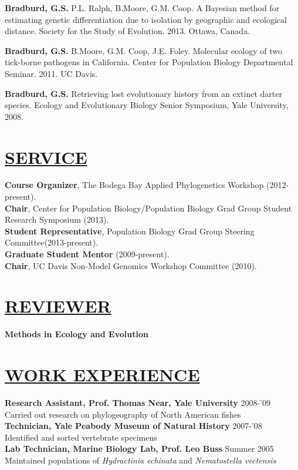 \documentclass{res}
\begin{document}
\begin{resume}
\textbf{Bradburd, G.S.}  P.L. Ralph, B.Moore, G.M. Coop. A Bayesian method for estimating genetic differentiation due to isolation by geographic and ecological distance.  Society for the Study of Evolution. 2013. Ottawa, Canada.\

\textbf{Bradburd, G.S.}  B.Moore, G.M. Coop, J.E. Foley. Molecular ecology of two tick-borne pathogens in California.  Center for Population Biology Departmental Seminar. 2011. UC Davis.\

\textbf{Bradburd, G.S.}  Retrieving lost evolutionary history from an extinct darter species.  Ecology and Evolutionary Biology Senior Symposium, Yale University, 2008.

\section{\underline{SERVICE}}
\textbf{Course Organizer}, The Bodega Bay Applied Phylogenetics Workshop (2012-present).\\
%
\textbf{Chair}, Center for Population Biology/Population Biology Grad Group Student Research Symposium (2013).\\
%
\textbf{Student Representative}, Population Biology Grad Group Steering Committee(2013-present).\\
%
\textbf{Graduate Student Mentor} (2009-present). \\
%
\textbf{Chair}, UC Davis Non-Model Genomics Workshop Committee (2010).
%
\section{\underline{REVIEWER}}
\textbf{Methods in Ecology and Evolution}


\section{\underline{WORK EXPERIENCE}}
\textbf{Research Assistant, Prof. Thomas Near, Yale University} 2008-'09 \\ \vspace{0.3mm}	%
\hspace{4.5mm}Carried out research on phylogeography of North American fishes\\
\textbf{Technician, Yale Peabody Museum of Natural History} 2007-'08 \\ \vspace{0.3mm}	%
\hspace{4.5mm}Identified and sorted vertebrate specimens\\ 
\textbf{Lab Technician, Marine Biology Lab, Prof. Leo Buss} Summer 2005 \\ \vspace{0.3mm}	%
\hspace{4.5mm}Maintained populations of \textit{Hydractinia echinata} and \textit{Nematostella vectensis} 


\end{resume}
\end{document}
